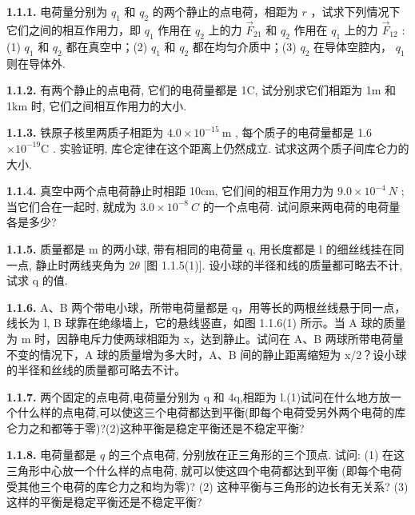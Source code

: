\textbf{1.1.1.} 电荷量分别为 $q_{1}$ 和 $q_{2}$ 的两个静止的点电荷，相距为 $r$ ，试求下列情况下它们之间的相互作用力，即 $q_{1}$ 作用在 $q_{2}$ 上的力 $\vec{F}_{21}$ 和 $q_{2}$ 作用在 $q_{1}$ 上的力 $\vec{F}_{12}$ :(1) $q_{1}$ 和 $q_{2}$ 都在真空中；(2) $q_{1}$ 和 $q_{2}$ 都在均匀介质中；(3) $q_{2}$ 在导体空腔内， $q_{1}$ 则在导体外.

\vfill

\textbf{1.1.2.} 有两个静止的点电荷, 它们的电荷量都是 1C, 试分别求它们相距为 1m 和 1km 时, 它们之间相互作用力的大小.

\vfill

\newpage
\textbf{1.1.3.} 铁原子核里两质子相距为 $4.0 \times 10^{-15} \mathrm{~m}$ , 每个质子的电荷量都是 1.6 $\times 10^{-19} \mathrm{C}$ . 实验证明, 库仑定律在这个距离上仍然成立. 试求这两个质子间库仑力的大小.

\vfill

\textbf{1.1.4.} 真空中两个点电荷静止时相距 10cm, 它们间的相互作用力为 $9.0 \times 10^{-4} ~N$ ; 当它们合在一起时, 就成为 $3.0 \times 10^{-8} ~C$ 的一个点电荷. 试问原来两电荷的电荷量各是多少?

\vfill

\newpage
\textbf{1.1.5.} 质量都是 m 的两小球, 带有相同的电荷量 q, 用长度都是 l 的细丝线挂在同一点, 静止时两线夹角为 $2\theta$ [图 1.1.5(1)]. 设小球的半径和线的质量都可略去不计, 试求 q 的值.

\vfill

\textbf{1.1.6.} A、B 两个带电小球，所带电荷量都是 q，用等长的两根丝线悬于同一点，线长为 l, B 球靠在绝缘墙上，它的悬线竖直，如图 1.1.6(1) 所示。当 A 球的质量为 m 时，因静电斥力使两球相距为 x，达到静止。试问在 A、B 两球所带电荷量不变的情况下，A 球的质量增为多大时，A、B 间的静止距离缩短为 x/2？设小球的半径和丝线的质量都可略去不计。



\begin{center}
\end{center}


\vfill

\newpage
\textbf{1.1.7.} 两个固定的点电荷,电荷量分别为 q 和 4q,相距为 l.(1)试问在什么地方放一个什么样的点电荷,可以使这三个电荷都达到平衡(即每个电荷受另外两个电荷的库仑力之和都等于零)?(2)这种平衡是稳定平衡还是不稳定平衡?

\vfill

\textbf{1.1.8.} 电荷量都是 $q$ 的三个点电荷, 分别放在正三角形的三个顶点. 试问: (1) 在这三角形中心放一个什么样的点电荷, 就可以使这四个电荷都达到平衡 (即每个电荷受其他三个电荷的库仑力之和均为零)? (2) 这种平衡与三角形的边长有无关系? (3) 这样的平衡是稳定平衡还是不稳定平衡?

